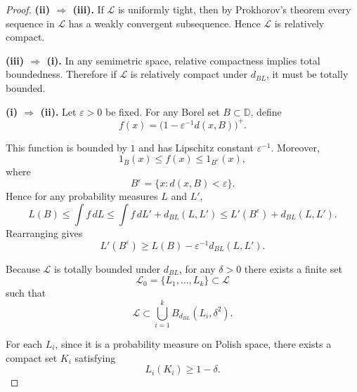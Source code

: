 \documentclass[12pt]{article}
\renewcommand{\(}{\left(}%
\renewcommand{\)}{\right)}%
\renewcommand{\[}{\left[}%
\renewcommand{\]}{\right]}%
\newtheorem{proof}{Proof.}}
\begin{document}
\begin{proof}

\textbf{(ii) $\Rightarrow$ (iii).}  
If $\mathscr L$ is uniformly tight, then by Prokhorov's theorem every sequence in $\mathscr L$ has a weakly convergent subsequence. Hence $\mathscr L$ is relatively compact.

\medskip
\noindent
\textbf{(iii) $\Rightarrow$ (i).}  
In any semimetric space, relative compactness implies total boundedness. Therefore if $\mathscr L$ is relatively compact under $d_{BL}$, it must be totally bounded.

\medskip
\noindent
\textbf{(i) $\Rightarrow$ (ii).}
Let $\varepsilon>0$ be fixed.  
For any Borel set $B\subset\mathbb D$, define
\begin{equation*}
f(x) = \bigl(1-\varepsilon^{-1}d(x,B)\bigr)^+ .
\end{equation*}

This function is bounded by $1$ and has Lipschitz constant $\varepsilon^{-1}$. Moreover,
\begin{equation*}
1_B(x)\le f(x)\le 1_{B^\varepsilon}(x),
\end{equation*}
where
\begin{equation*}
B^\varepsilon=\{x:d(x,B)<\varepsilon\}.
\end{equation*}
Hence for any probability measures $L$ and $L'$,
\begin{equation*}
L(B)
\le \int f\,dL
\le \int f\,dL' + d_{BL}(L,L')
\le L'(B^\varepsilon) + d_{BL}(L,L').
\end{equation*}
Rearranging gives
\begin{equation*}
L'(B^\varepsilon) \ge L(B) - \varepsilon^{-1} d_{BL}(L,L').
\end{equation*}

\medskip

Because $\mathscr L$ is totally bounded under $d_{BL}$, for any $\delta>0$ there exists a finite set
\begin{equation*}
\mathscr L_0 = \{L_1,\dots,L_k\}\subset\mathscr L
\end{equation*}
such that
\begin{equation*}
\mathscr L \subset \bigcup_{i=1}^k B_{d_{BL}}(L_i,\delta^2).
\end{equation*}

For each $L_i$, since it is a probability measure on Polish space, there exists a compact set $K_i$ satisfying
\begin{equation*}
L_i(K_i)\ge 1-\delta.
\end{equation*}


\end{proof}
\end{document}
